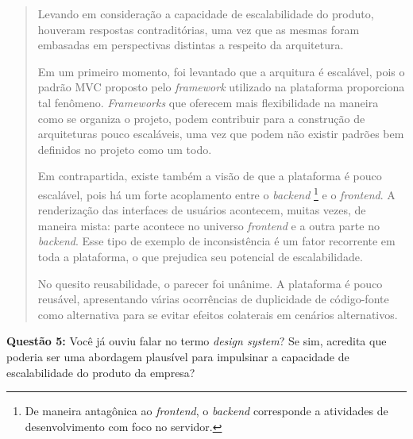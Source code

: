 \begin{quote}
    Levando em consideração a capacidade de escalabilidade do produto, houveram respostas contraditórias, uma vez que as mesmas foram embasadas em perspectivas distintas a respeito da arquitetura.
    
    Em um primeiro momento, foi levantado que a arquitura é escalável, pois o padrão MVC proposto pelo \textit{framework} utilizado na plataforma proporciona tal fenômeno. \textit{Frameworks} que oferecem mais flexibilidade na maneira como se organiza o projeto, podem contribuir para a construção de arquiteturas pouco escaláveis, uma vez que podem não existir padrões bem definidos no projeto como um todo.
    
    Em contrapartida, existe também a visão de que a plataforma é pouco escalável, pois há um forte acoplamento entre o \textit{backend} \footnote{De maneira antagônica ao \textit{frontend}, o \textit{backend} corresponde a atividades de desenvolvimento com foco no servidor.} e o \textit{frontend}. A renderização das interfaces de usuários acontecem, muitas vezes, de maneira mista: parte acontece no universo \textit{frontend} e a outra parte no \textit{backend}. Esse tipo de exemplo de inconsistência é um fator recorrente em toda a plataforma, o que prejudica seu potencial de escalabilidade.
    
    No quesito reusabilidade, o parecer foi unânime. A plataforma é pouco reusável, apresentando várias ocorrências de duplicidade de código-fonte como alternativa para se evitar efeitos colaterais em cenários alternativos.
\end{quote}

\textbf{Questão 5:} Você já ouviu falar no termo \textit{design system}? Se sim, acredita que poderia ser uma abordagem plausível para impulsinar a capacidade de escalabilidade do produto da empresa?

